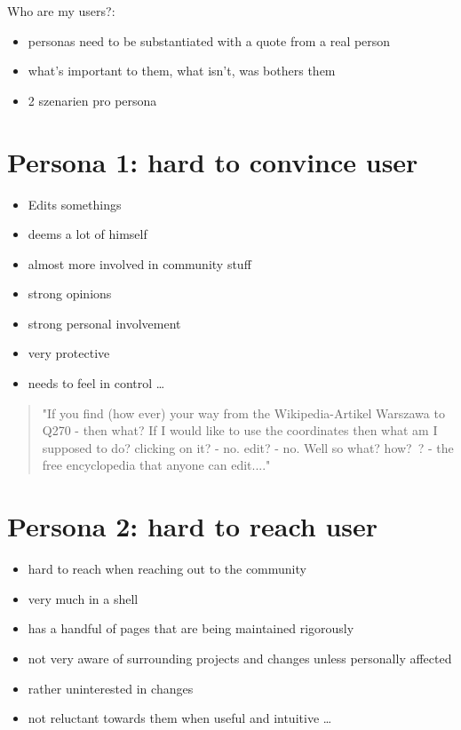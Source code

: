 \documentclass{article}
\date{11.11.2015}
\begin{document}
Who are my users?:
\begin{itemize}
\item personas need to be substantiated with a quote from a real person
\item what's important to them, what isn't, was bothers them
\item 2 szenarien pro persona
\end{itemize}

\section{Persona 1: hard to convince user}

\begin{itemize}
\item Edits somethings
\item deems a lot of himself 
\item almost more involved in community stuff
\item strong opinions
\item strong personal involvement
\item very protective
\item needs to feel in control \ldots
\end{itemize}

\begin{quote}
"If you find (how ever) your way from the Wikipedia-Artikel Warszawa to Q270 - then what? If I would like to use the coordinates then what am I supposed to do? clicking on it? - no. edit? - no. Well so what? how? ? - the free encyclopedia that anyone can edit...."
\end{quote}



\section{Persona 2: hard to reach user}

\begin{itemize}
\item hard to reach when reaching out to the community
\item very much in a shell
\item has a handful of pages that are being maintained rigorously
\item not very aware of surrounding projects and changes unless personally affected
\item rather uninterested in changes
\item not reluctant towards them when useful and intuitive \ldots
\end{itemize}
\end{document}
